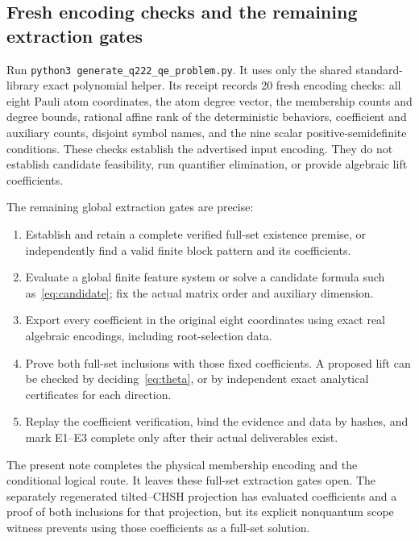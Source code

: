 \subsection{Fresh encoding checks and the remaining extraction gates}
Run \texttt{python3 generate\_q222\_qe\_problem.py}. It uses only the shared standard-library exact polynomial helper. Its receipt records 20 fresh encoding checks: all eight Pauli atom coordinates, the atom degree vector, the membership counts and degree bounds, rational affine rank of the deterministic behaviors, coefficient and auxiliary counts, disjoint symbol names, and the nine scalar positive-semidefinite conditions. These checks establish the advertised input encoding. They do not establish candidate feasibility, run quantifier elimination, or provide algebraic lift coefficients.

The remaining global extraction gates are precise:
\begin{enumerate}
\item Establish and retain a complete verified full-set existence premise, or independently find a valid finite block pattern and its coefficients.
\item Evaluate a global finite feature system or solve a candidate formula such as~\eqref{eq:candidate}; fix the actual matrix order and auxiliary dimension.
\item Export every coefficient in the original eight coordinates using exact real algebraic encodings, including root-selection data.
\item Prove both full-set inclusions with those fixed coefficients. A proposed lift can be checked by deciding~\eqref{eq:theta}, or by independent exact analytical certificates for each direction.
\item Replay the coefficient verification, bind the evidence and data by hashes, and mark E1--E3 complete only after their actual deliverables exist.
\end{enumerate}
The present note completes the physical membership encoding and the conditional logical route. It leaves these full-set extraction gates open. The separately regenerated tilted--CHSH projection has evaluated coefficients and a proof of both inclusions for that projection, but its explicit nonquantum scope witness prevents using those coefficients as a full-set solution.
